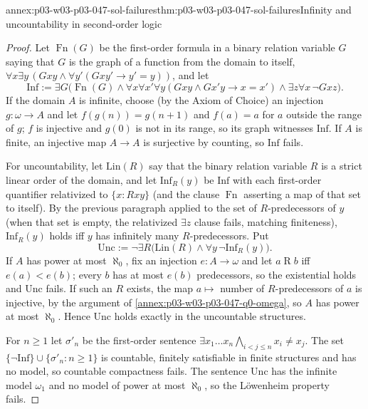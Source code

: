 \begin{annexitem}{annex:p03-w03-p03-047-sol-failures}{thm:p03-w03-p03-047-sol-failures}{Infinity and uncountability in second-order logic}
\begin{proof}
Let \(\operatorname{Fn}(G)\) be the first-order formula in a binary relation
variable \(G\) saying that \(G\) is the graph of a function from the domain
to itself, \(\forall x\exists y\,(Gxy\land\forall y'(Gxy'\to y'=y))\), and let
\[
 \mathrm{Inf}:=\exists G\bigl(\operatorname{Fn}(G)\land
 \forall x\forall x'\forall y(Gxy\land Gx'y\to x=x')\land
 \exists z\forall x\,\neg Gxz\bigr).
\]
If the domain \(A\) is infinite, choose (by the Axiom of Choice) an injection
\(g:\omega\to A\) and let \(f(g(n))=g(n+1)\) and \(f(a)=a\) for \(a\) outside
the range of \(g\); \(f\) is injective and \(g(0)\) is not in its range, so
its graph witnesses \(\mathrm{Inf}\).  If \(A\) is finite, an injective map
\(A\to A\) is surjective by counting, so \(\mathrm{Inf}\) fails.

For uncountability, let \(\mathrm{Lin}(R)\) say that the binary relation
variable \(R\) is a strict linear order of the domain, and let
\(\mathrm{Inf}_R(y)\) be \(\mathrm{Inf}\) with each first-order quantifier
relativized to \(\{x:Rxy\}\) (and the clause \(\operatorname{Fn}\) asserting
a map of that set to itself).  By the previous paragraph applied to the set
of \(R\)-predecessors of \(y\) (when that set is empty, the relativized
\(\exists z\) clause fails, matching finiteness), \(\mathrm{Inf}_R(y)\) holds iff \(y\) has
infinitely many \(R\)-predecessors.  Put
\[
 \mathrm{Unc}:=\neg\exists R\bigl(\mathrm{Lin}(R)\land\forall y\,\neg
 \mathrm{Inf}_R(y)\bigr).
\]
If \(A\) has power at most \(\aleph_0\), fix an injection
\(e:A\to\omega\) and let \(a\mathrel{R}b\) iff \(e(a)<e(b)\); every \(b\) has
at most \(e(b)\) predecessors, so the existential holds and \(\mathrm{Unc}\)
fails.  If such an \(R\) exists, the map \(a\mapsto\) number of
\(R\)-predecessors of \(a\) is injective, by the argument of
\cref{annex:p03-w03-p03-047-q0-omega}, so \(A\) has power at most
\(\aleph_0\).  Hence \(\mathrm{Unc}\) holds exactly in the uncountable
structures.

For \(n\ge1\) let \(\sigma'_n\) be the first-order sentence
\(\exists x_1\ldots x_n\bigwedge_{i<j\le n}x_i\ne x_j\).  The set
\(\{\neg\mathrm{Inf}\}\cup\{\sigma'_n:n\ge1\}\) is countable, finitely
satisfiable in finite structures and has no model, so countable compactness
fails.  The sentence \(\mathrm{Unc}\) has the infinite model \(\omega_1\) and
no model of power at most \(\aleph_0\), so the L\"owenheim property fails.
\end{proof}
\end{annexitem}

